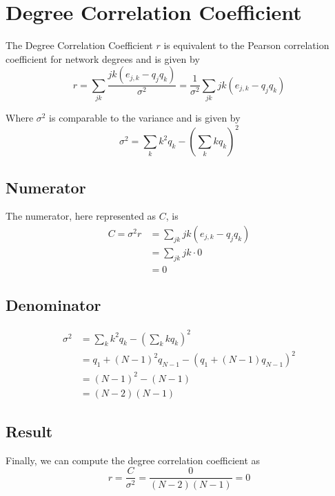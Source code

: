 \section{Degree Correlation Coefficient}

The Degree Correlation Coefficient $r$ is equivalent to the Pearson correlation coefficient for network degrees and is given by
\[
    r = \sum_{j k} \frac{j k \left(e_{j,k} - q_j q_k\right)}{\sigma^2} = \frac{1}{\sigma^2} \sum_{j k} j k \left(e_{j,k} - q_j q_k\right)
    \tag{7.11} \label{eq:coefficient}
\]

Where $\sigma^2$ is comparable to the variance and is given by
\[
    \sigma^2 = \sum_{k} k^2 q_k - \left(\sum_{k} k q_k\right)^2
    \tag{7.12} \label{eq:variance}
\]

\subsection{Numerator}

    The numerator, here represented as $C$, is
    \begin{align*}
        C = \sigma^2 r
            &= \sum_{j k} j k \left(e_{j,k} - q_j q_k\right) \\
            &= \sum_{j k} j k \cdot 0 \\
            &= 0
    \end{align*}

\subsection{Denominator}

    \begin{align*}
        \sigma^2 &= \sum_{k} k^2 q_k - \left(\sum_{k} k q_k\right)^2 \\
        &= q_1 + (N-1)^2 q_{N-1} - \left(q_1 + (N-1) q_{N-1}\right)^2 \\
        &= (N-1)^2 - (N-1) \\
        &= (N-2) (N-1)
    \end{align*}

\subsection{Result}

    Finally, we can compute the degree correlation coefficient as
    \[
        r = \frac{C}{\sigma^2} = \frac{0}{(N-2)(N-1)} = 0
    \]
